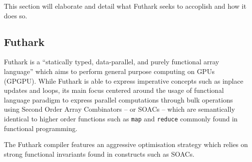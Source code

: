 \documentclass[11pt]{article}
\begin{document}
This section will elaborate and detail what Futhark seeks to accoplish and how it does so.



\subsection{Futhark}

Futhark is a ``statically typed, data-parallel, and purely functional array language'' \cite{futharklang} which aims to perform
 general purpose computing on GPUs (GPGPU). While Futhark is able to express imperative concepts such as inplace updates and loops, its main focus centered around the usage of
 functional language paradigm to express parallel computations through bulk operations using Second Order Array Combinators
 -- or SOACs -- which are semantically identical to higher order functions such as \texttt{map} and \texttt{reduce} commonly found in functional programming.

The Futhark compiler features an aggressive optimisation strategy which relies on strong functional invariants found in constructs such as SOACs.
\end{document}

